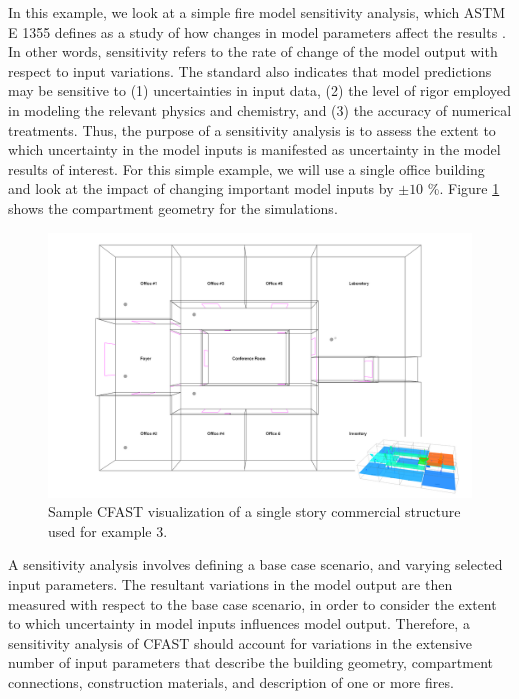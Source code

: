 \documentclass[12pt,twoside]{book}
\begin{document}
In this example, we look at a simple fire model sensitivity analysis, which ASTM E 1355 defines as a study of how changes in model parameters affect the results \cite{CFAST:ASTM:E1355}. In other words, sensitivity refers to the rate of change of the model output with respect to input variations. The standard also indicates that model predictions may be sensitive to (1) uncertainties in input data, (2) the level of rigor employed in modeling the relevant physics and chemistry, and (3) the accuracy of numerical treatments. Thus, the purpose of a sensitivity analysis is to assess the extent to which uncertainty in the model inputs is manifested as uncertainty in the model results of interest. For this simple example, we will use a single office building and look at the impact of changing important model inputs by $\pm 10$ \%. Figure \ref{sensitivity_geometry} shows the compartment geometry for the simulations.

\begin{figure}[h!]
\centering
\includegraphics[width=6.5in]{FIGURES/Sensitivity.png}
\caption{Sample CFAST visualization of a single story commercial structure used for example 3.}
\label{sensitivity_geometry}
\end{figure}

A sensitivity analysis involves defining a base case scenario, and varying selected input parameters. The resultant variations in the model output are then measured with respect to the base case scenario, in order to consider the extent to which uncertainty in model inputs influences model output. Therefore, a sensitivity analysis of CFAST should account for variations in the extensive number of input parameters that describe the building geometry, compartment connections, construction materials, and description of one or more fires.
\end{document}
